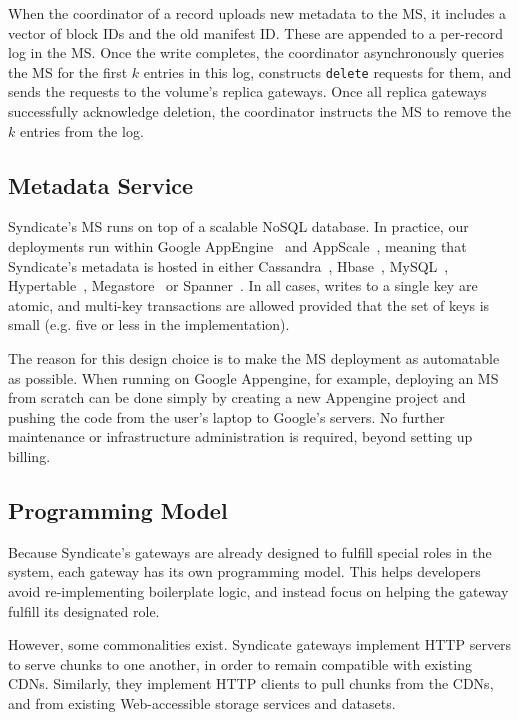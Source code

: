 When the coordinator of a record uploads new metadata to the MS, it includes a
vector of block IDs and the old manifest ID.  These are appended to a per-record
log in the MS.  Once the write completes, the coordinator asynchronously queries
the MS for the first $k$ entries in this log, constructs \texttt{delete}
requests for them, and sends the requests to the volume's replica gateways.
Once all replica gateways successfully acknowledge deletion, the coordinator
instructs the MS to remove the $k$ entries from the log.

\subsection{Metadata Service}

Syndicate's MS runs on top of a scalable NoSQL database.  In practice, our
deployments run within Google AppEngine~\cite{google-appengine} and
AppScale~\cite{appscale}, meaning that
Syndicate's metadata is hosted in either Cassandra~\cite{cassandra},
Hbase~\cite{hbase}, MySQL~\cite{mysql}, Hypertable~\cite{hypertable}, Megastore~\cite{megastore} or
Spanner~\cite{spanner}.  In all cases, writes to a single key are atomic, and
multi-key transactions are allowed provided that the set of keys is small (e.g.
five or less in the implementation).

The reason for this design choice is to make the MS deployment as automatable as
possible.  When running on Google Appengine, for example, deploying an MS from
scratch can be done simply by creating a new Appengine project and pushing the
code from the user's laptop to Google's servers.  No further maintenance or
infrastructure administration is required, beyond setting up billing.

\subsection{Programming Model}

Because Syndicate's gateways are already designed to fulfill special roles in
the system, each gateway has its own programming model.  This helps developers
avoid re-implementing boilerplate logic, and instead focus on helping the
gateway fulfill its designated role.

However, some commonalities exist.
Syndicate gateways implement HTTP servers to serve chunks to one
another, in order to remain compatible with existing CDNs.  Similarly, they
implement HTTP clients to pull chunks from the CDNs, and from existing
Web-accessible storage services and datasets.

